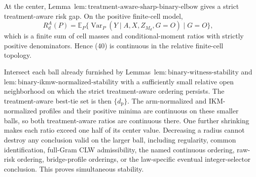 At the center, Lemma~\(\mathrm{lem{:}treatment\text{-}aware\text{-}sharp\text{-}binary\text{-}elbow}\) gives a strict treatment-aware risk gap. On the positive finite-cell model,
\[
 R_d^A(P)=\mathbb E_P\{\operatorname{Var}_P(Y\mid A,X,Z_{M_d},G=O)\mid G=O\}, \tag{40}
\]
which is a finite sum of cell masses and conditional-moment ratios with strictly positive denominators. Hence (40) is continuous in the relative finite-cell topology.

Intersect each ball already furnished by Lemmas~\(\mathrm{lem{:}binary\text{-}witness\text{-}stability}\) and \(\mathrm{lem{:}binary\text{-}ikmw\text{-}normalized\text{-}stability}\) with a sufficiently small relative open neighborhood on which the strict treatment-aware ordering persists. The treatment-aware best-tie set is then \(\{d_{\mathrm p}\}\). The arm-normalized and IKM-normalized profiles and their positive minima are continuous on these smaller balls, so both treatment-aware ratios are continuous there. One further shrinking makes each ratio exceed one half of its center value. Decreasing a radius cannot destroy any conclusion valid on the larger ball, including regularity, common identification, full-Gram CLW admissibility, the named continuous ordering, raw-risk ordering, bridge-profile orderings, or the law-specific eventual integer-selector conclusion. This proves simultaneous stability.